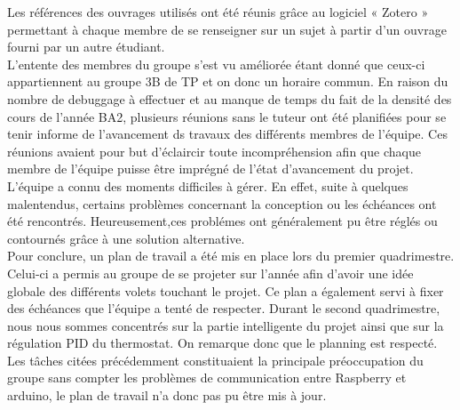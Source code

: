 \documentclass[12pt]{report}
\begin{document}
\noindent
Les r\'{e}f\'{e}rences des ouvrages utilis\'{e}s ont \'{e}t\'{e} r\'{e}unis gr\^{a}ce au logiciel « Zotero » permettant \`{a} chaque membre de se renseigner sur un sujet \`{a} partir d’un ouvrage fourni par un autre étudiant.\\

\noindent
L'entente des membres du groupe s'est vu améliorée étant donné que ceux-ci appartiennent au groupe 3B de TP et on donc un horaire commun. En raison du  nombre de debuggage à effectuer et au manque de temps du fait de la densité des cours de l'année BA2, plusieurs réunions sans le tuteur ont été planifiées pour se
tenir informe de l'avancement ds travaux des différents membres de l'équipe. Ces réunions avaient pour but d'éclaircir toute incompréhension afin que chaque membre de l'équipe puisse être imprégné de l'état
d'avancement du projet.\\

\noindent
L’\'{e}quipe a connu des moments difficiles \`{a} g\'{e}rer. En effet, suite \`{a} quelques malentendus, certains probl\`{e}mes concernant la conception ou les \'{e}ch\'{e}ances ont \'{e}t\'{e} rencontr\'{e}s. Heureusement,ces probl\'{e}mes ont généralement pu être r\'{e}glés ou contournés grâce à une solution alternative.\\

\noindent
Pour conclure, un plan de travail a \'{e}t\'{e} mis en place lors du premier quadrimestre. Celui-ci a permis au groupe de se projeter sur l'ann\'{e}e afin d'avoir une id\'{e}e globale des diff\'{e}rents volets touchant le projet. Ce plan a \'{e}galement servi \`{a} fixer des \'{e}ch\'{e}ances que l'\'{e}quipe a tent\'{e} de respecter.
Durant le second quadrimestre, nous nous sommes concentrés sur la partie intelligente du projet ainsi que sur la régulation PID du thermostat. On remarque donc que le planning est respecté. Les tâches citées précédemment constituaient la principale préoccupation du groupe sans compter les problèmes de communication entre Raspberry et arduino, le plan de travail n'a donc pas pu être mis à jour.   %
 
\end{document}
